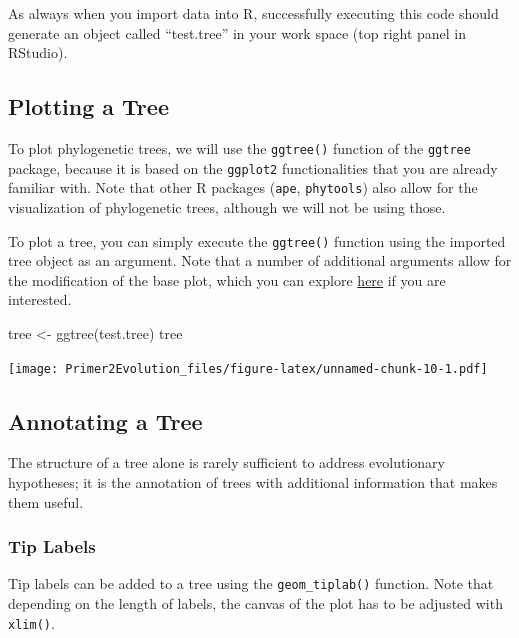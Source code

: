 \documentclass[
]{book}
\newenvironment{Shaded}{\begin{snugshade}}{\end{snugshade}}
\newcommand{\FunctionTok}[1]{\textcolor[rgb]{0.00,0.00,0.00}{#1}}
\newcommand{\NormalTok}[1]{#1}
\newcommand{\OtherTok}[1]{\textcolor[rgb]{0.56,0.35,0.01}{#1}}
\begin{document}
As always when you import data into R, successfully executing this code should generate an object called ``test.tree'' in your work space (top right panel in RStudio).

\hypertarget{plotting-a-tree}{%
\subsection{Plotting a Tree}\label{plotting-a-tree}}

To plot phylogenetic trees, we will use the \texttt{ggtree()} function of the \texttt{ggtree} package, because it is based on the \texttt{ggplot2} functionalities that you are already familiar with. Note that other R packages (\texttt{ape}, \texttt{phytools}) also allow for the visualization of phylogenetic trees, although we will not be using those.

To plot a tree, you can simply execute the \texttt{ggtree()} function using the imported tree object as an argument. Note that a number of additional arguments allow for the modification of the base plot, which you can explore \href{https://yulab-smu.top/treedata-book/chapter4.html}{here} if you are interested.

\begin{Shaded}
\begin{Highlighting}[]
\NormalTok{tree }\OtherTok{\textless{}{-}} \FunctionTok{ggtree}\NormalTok{(test.tree)}
\NormalTok{tree}
\end{Highlighting}
\end{Shaded}

\texttt{[image: Primer2Evolution\_files/figure-latex/unnamed-chunk-10-1.pdf]}

\hypertarget{annotating-a-tree}{%
\subsection{Annotating a Tree}\label{annotating-a-tree}}

The structure of a tree alone is rarely sufficient to address evolutionary hypotheses; it is the annotation of trees with additional information that makes them useful.

\hypertarget{tip-labels}{%
\subsubsection*{Tip Labels}\label{tip-labels}}

Tip labels can be added to a tree using the \texttt{geom\_tiplab()} function. Note that depending on the length of labels, the canvas of the plot has to be adjusted with \texttt{xlim()}.
\end{document}
